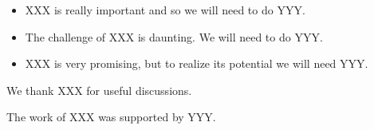 \documentclass[twocolumn]{svjour3}
\begin{document}
\begin{itemize}

\item XXX is really important and so we will need to do YYY.

\item The challenge of XXX is daunting. We will need to do YYY.

\item XXX is very promising, but to realize its potential we will need
YYY.

\end{itemize}


\begin{acknowledgements}

We thank XXX for useful discussions.

The work of XXX was supported by YYY.

\end{acknowledgements}




\end{document}
